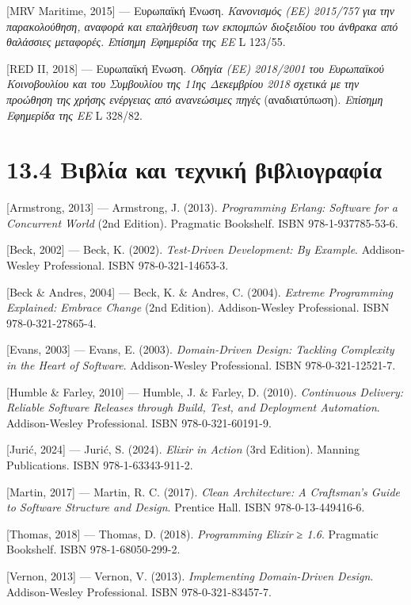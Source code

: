 {[}MRV Maritime, 2015{]} --- Ευρωπαϊκή Ένωση. \emph{Κανονισμός (ΕΕ)
2015/757 για την παρακολούθηση, αναφορά και επαλήθευση των εκπομπών
διοξειδίου του άνθρακα από θαλάσσιες μεταφορές}. \emph{Επίσημη Εφημερίδα
της ΕΕ} L 123/55.

{[}RED II, 2018{]} --- Ευρωπαϊκή Ένωση. \emph{Οδηγία (ΕΕ) 2018/2001 του
Ευρωπαϊκού Κοινοβουλίου και του Συμβουλίου της 11ης Δεκεμβρίου 2018
σχετικά με την προώθηση της χρήσης ενέργειας από ανανεώσιμες πηγές}
(αναδιατύπωση). \emph{Επίσημη Εφημερίδα της ΕΕ} L 328/82.

\section{13.4 Βιβλία και τεχνική
βιβλιογραφία}\label{ux3b2ux3b9ux3b2ux3bbux3afux3b1-ux3baux3b1ux3b9-ux3c4ux3b5ux3c7ux3bdux3b9ux3baux3ae-ux3b2ux3b9ux3b2ux3bbux3b9ux3bfux3b3ux3c1ux3b1ux3c6ux3afux3b1}

{[}Armstrong, 2013{]} --- Armstrong, J. (2013). \emph{Programming
Erlang: Software for a Concurrent World} (2nd Edition). Pragmatic
Bookshelf. ISBN 978-1-937785-53-6.

{[}Beck, 2002{]} --- Beck, K. (2002). \emph{Test-Driven Development: By
Example}. Addison-Wesley Professional. ISBN 978-0-321-14653-3.

{[}Beck \& Andres, 2004{]} --- Beck, K. \& Andres, C. (2004).
\emph{Extreme Programming Explained: Embrace Change} (2nd Edition).
Addison-Wesley Professional. ISBN 978-0-321-27865-4.

{[}Evans, 2003{]} --- Evans, E. (2003). \emph{Domain-Driven Design:
Tackling Complexity in the Heart of Software}. Addison-Wesley
Professional. ISBN 978-0-321-12521-7.

{[}Humble \& Farley, 2010{]} --- Humble, J. \& Farley, D. (2010).
\emph{Continuous Delivery: Reliable Software Releases through Build,
Test, and Deployment Automation}. Addison-Wesley Professional. ISBN
978-0-321-60191-9.

{[}Jurić, 2024{]} --- Jurić, S. (2024). \emph{Elixir in Action} (3rd
Edition). Manning Publications. ISBN 978-1-63343-911-2.

{[}Martin, 2017{]} --- Martin, R. C. (2017). \emph{Clean Architecture: A
Craftsman's Guide to Software Structure and Design}. Prentice Hall. ISBN
978-0-13-449416-6.

{[}Thomas, 2018{]} --- Thomas, D. (2018). \emph{Programming Elixir ≥
1.6}. Pragmatic Bookshelf. ISBN 978-1-68050-299-2.

{[}Vernon, 2013{]} --- Vernon, V. (2013). \emph{Implementing
Domain-Driven Design}. Addison-Wesley Professional. ISBN
978-0-321-83457-7.

